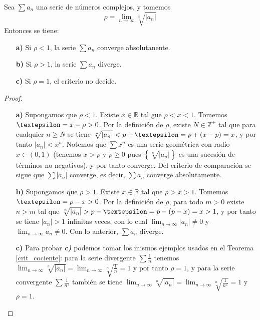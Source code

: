 \begin{theorem}
  Sea $\sum a_n$ una serie de números complejos, y tomemos
  $$
    \rho=\lim _{n \rightarrow \infty} \sqrt[n]{\left|a_n\right|}
  $$
  Entonces se tiene:
  \begin{itemize}
  \item[\textbf{a)}] Si $\rho<1$, la serie $\sum a_n$ converge absolutanente.
  \item[\textbf{b)}] Si $\rho>1$, la serie $\sum a_n$ diverge.
  \item[\textbf{c)}] Si $\rho=1$, el criterio no decide.
  \end{itemize}
\end{theorem}
\begin{proof}
  \begin{itemize}
  \item[\textbf{a)}] Supongamos que $\rho<1$. Existe $x \in \mathbb{R}$ tal gue $\rho<x<1$. Tomemos $\text{\textepsilon}=x-\rho>0$. Por la definición de $\rho$, existe $N \in \mathbb{Z}^{+}$ tal que para cualquier $n \geq N$ se tiene $\sqrt[n]{\left|a_n\right|}<p+\text{\textepsilon}=p+(x-p)=x$, y por tanto $\left|a_n\right|<x^n$. Notemos que $\sum x^n$ es una serie geométrica con radio $x \in(0,1)$ (tenemos $x>\rho$ y $\rho \geq0$ pues $\left\{\sqrt[n]{|a_{n}|}\right\}$ es una sucesión de términos no negativos), y por tanto converge. Del criterio de comparación se sigue que $\sum |a_n|$ converge, es decir, $\sum a_n$ converge absolutamente.
  \item[\textbf{b)}] Supongamos que $\rho>1$. Existe $x \in \mathbb{R}$ tal que $\rho>x>1$. Tomemos $\text{\textepsilon}=\rho-x>0$. Por la definición de $\rho$, para todo $m>0$ existe $n>m$ tal que $\sqrt[n]{\left|a_n\right|}>p-\text{\textepsilon}=p-(p-x)=x>1$, y por tanto se tiene $\left|a_n\right|>1$ infinitas veces, con lo cual $\lim _{n \rightarrow \infty}\left|a_n\right| \neq 0$ y $\lim _{n \rightarrow \infty} a_n \neq 0$. Con lo anterior, $\sum a_n$ diverge.
  \item[\textbf{c)}] Para probar \textit{\textbf{c)}} podemos tomar los mismos ejemplos usados en el Teorema \ref{crit_cociente}: para la serie divergente $\sum \frac{1}{n}$ tenemos $\lim _{n \rightarrow \infty} \sqrt[n]{\left|a_n\right|}=\lim _{n \rightarrow \infty} \sqrt[n]{\frac{1}{n}}=1$ y por tanto $\rho=1$, y para la serie convergente $\sum \frac{1}{n^2}$ también se tiene $\lim _{n \rightarrow \infty} \sqrt[n]{\left|a_n\right|}=\lim _{n \rightarrow \infty} \sqrt[n]{\frac{1}{n^2}}=1$ y $\rho=1$.
  \end{itemize}
\end{proof}

